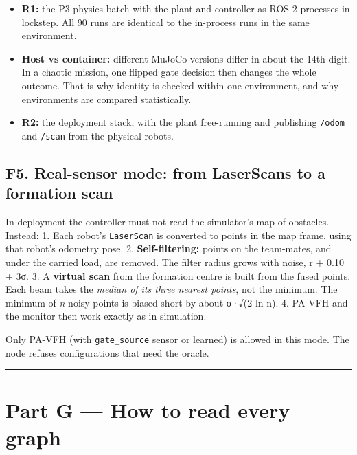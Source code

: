 \documentclass[
  10.5pt,
  a4paper,
]{article}
\providecommand{\tightlist}{%
  \setlength{\itemsep}{0pt}\setlength{\parskip}{0pt}}
\begin{document}
\begin{itemize}
\tightlist
\item
  \textbf{R1:} the P3 physics batch with the plant and controller as ROS
  2 processes in lockstep. All 90 runs are identical to the in-process
  runs in the same environment.
\item
  \textbf{Host vs container:} different MuJoCo versions differ in about
  the 14th digit. In a chaotic mission, one flipped gate decision then
  changes the whole outcome. That is why identity is checked within one
  environment, and why environments are compared statistically.
\item
  \textbf{R2:} the deployment stack, with the plant free-running and
  publishing \texttt{/odom} and \texttt{/scan} from the physical robots.
\end{itemize}

\hypertarget{f5.-real-sensor-mode-from-laserscans-to-a-formation-scan}{%
\subsection{F5. Real-sensor mode: from LaserScans to a formation
scan}\label{f5.-real-sensor-mode-from-laserscans-to-a-formation-scan}}

In deployment the controller must not read the simulator's map of
obstacles. Instead: 1. Each robot's \texttt{LaserScan} is converted to
points in the map frame, using that robot's odometry pose. 2.
\textbf{Self-filtering:} points on the team-mates, and under the carried
load, are removed. The filter radius grows with noise, r + 0.10 + 3σ. 3.
A \textbf{virtual scan} from the formation centre is built from the
fused points. Each beam takes the \emph{median of its three nearest
points}, not the minimum. The minimum of \emph{n} noisy points is biased
short by about σ·√(2 ln n). 4. PA-VFH and the monitor then work exactly
as in simulation.

Only PA-VFH (with \texttt{gate\_source} sensor or learned) is allowed in
this mode. The node refuses configurations that need the oracle.

\begin{center}\rule{0.5\linewidth}{0.5pt}\end{center}

\hypertarget{part-g-how-to-read-every-graph}{%
\section{Part G --- How to read every
graph}\label{part-g-how-to-read-every-graph}}
\end{document}
